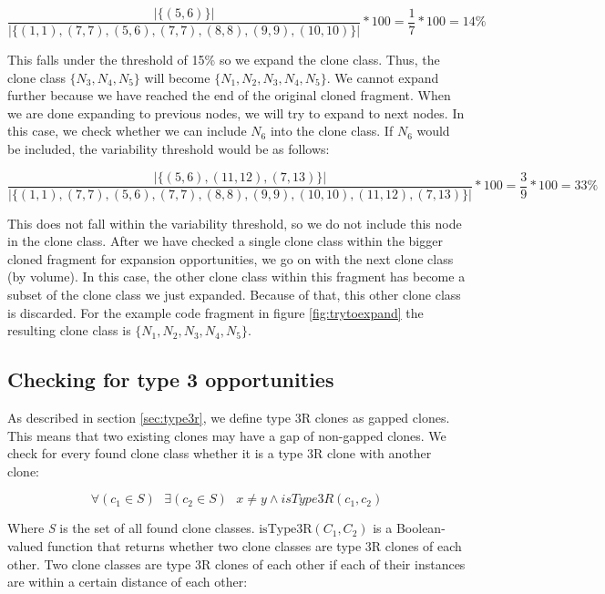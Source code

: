 \begin{equation}\label{eq:variabilitycombined2}
\frac{|\{(5,6)\}|}{|\{(1,1),(7,7),(5,6),(7,7),(8,8),(9,9),(10,10)\}|}*100 = \frac{1}{7}*100 = 14\%
\end{equation}

This falls under the threshold of 15\% so we expand the clone class. Thus, the clone class $\{N_3, N_4, N_5\}$ will become $\{N_1, N_2, N_3, N_4, N_5\}$. We cannot expand further because we have reached the end of the original cloned fragment. When we are done expanding to previous nodes, we will try to expand to next nodes. In this case, we check whether we can include $N_6$ into the clone class. If $N_6$ would be included, the variability threshold would be as follows:

\begin{equation}\label{eq:variabilitycombined3}
\frac{|\{(5,6),(11,12),(7,13)\}|}{|\{(1,1),(7,7),(5,6),(7,7),(8,8),(9,9),(10,10),(11,12),(7,13)\}|}*100 = \frac{3}{9}*100 = 33\%
\end{equation}

This does not fall within the variability threshold, so we do not include this node in the clone class. After we have checked a single clone class within the bigger cloned fragment for expansion opportunities, we go on with the next clone class (by volume). In this case, the other clone class within this fragment has become a subset of the clone class we just expanded. Because of that, this other clone class is discarded. For the example code fragment in figure \ref{fig:trytoexpand} the resulting clone class is $\{N_1, N_2, N_3, N_4, N_5\}$.

\subsection{Checking for type 3 opportunities} \label{sec:t3rclonerefactor}
As described in section \ref{sec:type3r}, we define type 3R clones as gapped clones. This means that two existing clones may have a gap of non-gapped clones. We check for every found clone class whether it is a type 3R clone with another clone:

\begin{equation}\label{eq:crtype3r}
\forall (c_1 \in S) \text{ }\exists (c_2 \in S)\text{ }x \neq y \land isType3R(c_1, c_2)
\end{equation}

Where \textit{S} is the set of all found clone classes. $\text{isType3R}(C_1, C_2)$ is a Boolean-valued function that returns whether two clone classes are type 3R clones of each other. Two clone classes are type 3R clones of each other if each of their instances are within a certain distance of each other:

